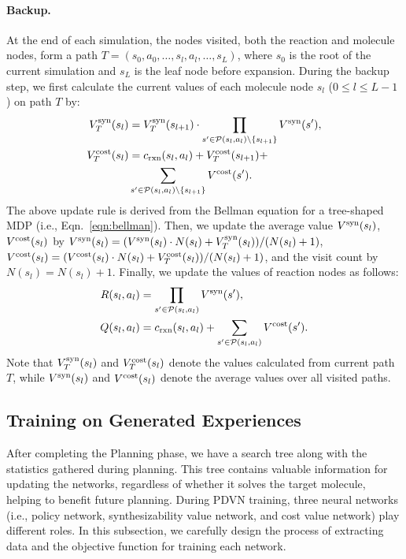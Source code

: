 \documentclass[nohyperref]{article}
\theoremstyle{plain}
\theoremstyle{definition}
\theoremstyle{remark}
\begin{document}
\paragraph{Backup.}
At the end of each simulation, the nodes visited, both the reaction and molecule nodes, form a path $T = (s_0, a_0, \dots, s_l, a_l, \dots, s_L)$, where $s_0$ is the root of the current simulation and $s_L$ is the leaf node before expansion.
During the backup step, we first calculate the current values of each molecule node $s_l$ ($ 0 \le l \le L-1$ ) on path $T$ by: 
\begin{equation}
\begin{aligned}
V_{T}^{\rm syn}(s_l) & = V_T^{\rm syn}(s_{l+1}) \cdot \prod_{s'\in\mathcal{P}(s_l, a_l)\setminus\{s_{l+1}\}} V^{\rm syn}(s'), \\
V_{T}^{\rm cost}(s_l) & = c_{\rm rxn}(s_l, a_l) + V_T^{\rm cost}(s_{l+1})  + \\
&\sum_{s'\in\mathcal{P}(s_l, a_l)\setminus\{s_{l+1}\}} V^{\rm cost}(s'). \\
\label{eqn:backup}
\end{aligned}
\end{equation}
The above update rule is derived from the Bellman equation for a tree-shaped MDP (i.e., Eqn.~\ref{eqn:bellman}).  
Then, we update the average value
$V^{\rm syn}(s_l)$, $V^{\rm cost}(s_l)$ by $V^{\rm syn}(s_l) = (V^{\rm syn}(s_l) \cdot N(s_l) + V_T^{\rm syn}(s_l)) / (N(s_l) + 1)$, $V^{\rm cost}(s_l) = (V^{\rm cost}(s_l) \cdot N(s_l) + V^{\rm cost}_{T}(s_l)) / (N(s_l) + 1)$,  and the visit count by $N(s_l) = N(s_l)+1$.
Finally, we update the values of reaction nodes as follows:
\begin{equation}
\begin{aligned}
R(s_l, a_l) & = \prod_{s'\in\mathcal{P}(s_l, a_l)} V^{\rm syn}(s'), \\
Q(s_l, a_l) & = c_{\rm rxn}(s_l, a_l) + \sum_{s'\in\mathcal{P}(s_l, a_l)} V^{\rm cost}(s'). \\
\end{aligned}
\end{equation}
Note that $V_T^{\rm syn}(s_l)$ and $V_T^{\rm cost}(s_l)$ denote the values calculated from current path $T$, while $V^{\rm syn}(s_l)$ and $V^{\rm cost}(s_l)$ denote the average values over all visited paths.


\subsection{Training on Generated Experiences}\label{sec:training}
After completing the Planning phase, we have a search tree along with the statistics gathered during planning. 
This tree contains valuable information for updating the networks, regardless of whether it solves the target molecule, helping to benefit future planning.
During PDVN training, three neural networks (i.e., policy network, synthesizability value network, and cost value network) play different roles. 
In this subsection, we carefully design the process of extracting data and the objective function for training each network.
\end{document}
